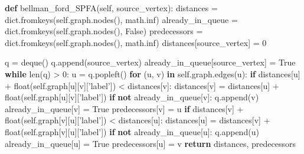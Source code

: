 \documentclass[11pt]{article}
\newenvironment{Shaded}{}{}
\newcommand{\KeywordTok}[1]{\textcolor[rgb]{0.00,0.44,0.13}{\textbf{{#1}}}}
\newcommand{\DecValTok}[1]{\textcolor[rgb]{0.25,0.63,0.44}{{#1}}}
\newcommand{\StringTok}[1]{\textcolor[rgb]{0.25,0.44,0.63}{{#1}}}
\newcommand{\NormalTok}[1]{{#1}}
\newcommand{\VariableTok}[1]{\textcolor[rgb]{0.10,0.09,0.49}{{#1}}}
\newcommand{\ControlFlowTok}[1]{\textcolor[rgb]{0.00,0.44,0.13}{\textbf{{#1}}}}
\newcommand{\OperatorTok}[1]{\textcolor[rgb]{0.40,0.40,0.40}{{#1}}}
\newcommand{\BuiltInTok}[1]{{#1}}
\begin{document}
\begin{Shaded}
\begin{Highlighting}[]
\KeywordTok{def}\NormalTok{ bellman_ford_SPFA(}\VariableTok{self}\NormalTok{, source_vertex): }
\NormalTok{    distances }\OperatorTok{=} \BuiltInTok{dict}\NormalTok{.fromkeys(}\VariableTok{self}\NormalTok{.graph.nodes(), math.inf)}
\NormalTok{    already_in_queue }\OperatorTok{=} \BuiltInTok{dict}\NormalTok{.fromkeys(}\VariableTok{self}\NormalTok{.graph.nodes(), }\VariableTok{False}\NormalTok{)}
\NormalTok{    predecessors }\OperatorTok{=} \BuiltInTok{dict}\NormalTok{.fromkeys(}\VariableTok{self}\NormalTok{.graph.nodes(), math.inf)}
\NormalTok{    distances[source_vertex] }\OperatorTok{=} \DecValTok{0}
    
\NormalTok{    q }\OperatorTok{=}\NormalTok{ deque()}
\NormalTok{    q.append(source_vertex)}
\NormalTok{    already_in_queue[source_vertex] }\OperatorTok{=} \VariableTok{True}
    \ControlFlowTok{while} \BuiltInTok{len}\NormalTok{(q) }\OperatorTok{>} \DecValTok{0}\NormalTok{:}
\NormalTok{        u }\OperatorTok{=}\NormalTok{ q.popleft()}
        \ControlFlowTok{for}\NormalTok{ (u, v) }\KeywordTok{in} \VariableTok{self}\NormalTok{.graph.edges(u):}
            \ControlFlowTok{if}\NormalTok{ distances[u] }\OperatorTok{+} \BuiltInTok{float}\NormalTok{(}\VariableTok{self}\NormalTok{.graph[u][v][}\StringTok{'label'}\NormalTok{]) }\OperatorTok{<}\NormalTok{ distances[v]:}
\NormalTok{                distances[v] }\OperatorTok{=}\NormalTok{ distances[u] }\OperatorTok{+} \BuiltInTok{float}\NormalTok{(}\VariableTok{self}\NormalTok{.graph[u][v][}\StringTok{'label'}\NormalTok{])}
                \ControlFlowTok{if} \KeywordTok{not}\NormalTok{ already_in_queue[v]:}
\NormalTok{                    q.append(v)}
\NormalTok{                    already_in_queue[v] }\OperatorTok{=} \VariableTok{True}
\NormalTok{                predecessors[v] }\OperatorTok{=}\NormalTok{ u}
            \ControlFlowTok{if}\NormalTok{ distances[v] }\OperatorTok{+} \BuiltInTok{float}\NormalTok{(}\VariableTok{self}\NormalTok{.graph[v][u][}\StringTok{'label'}\NormalTok{]) }\OperatorTok{<}\NormalTok{ distances[u]:}
\NormalTok{                distances[u] }\OperatorTok{=}\NormalTok{ distances[v] }\OperatorTok{+} \BuiltInTok{float}\NormalTok{(}\VariableTok{self}\NormalTok{.graph[v][u][}\StringTok{'label'}\NormalTok{])}
                \ControlFlowTok{if} \KeywordTok{not}\NormalTok{ already_in_queue[u]:}
\NormalTok{                    q.append(u)}
\NormalTok{                    already_in_queue[u] }\OperatorTok{=} \VariableTok{True}
\NormalTok{                predecessors[u] }\OperatorTok{=}\NormalTok{ v}
    \ControlFlowTok{return}\NormalTok{ distances, predecessors}
\end{Highlighting}
\end{Shaded}
\end{document}
